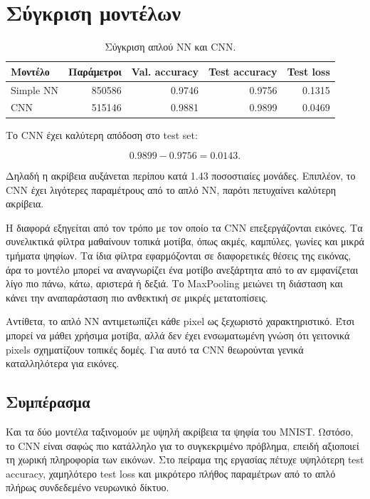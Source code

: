 \documentclass[12pt,a4paper]{article}
\begin{document}
\section{Σύγκριση μοντέλων}

\begin{table}[H]
\centering
\caption{Σύγκριση απλού NN και CNN.}
\begin{tabular}{lrrrr}
\toprule
\textbf{Μοντέλο} & \textbf{Παράμετροι} & \textbf{Val. accuracy} & \textbf{Test accuracy} & \textbf{Test loss} \\
\midrule
Simple NN & 850586 & 0.9746 & 0.9756 & 0.1315 \\
CNN & 515146 & 0.9881 & 0.9899 & 0.0469 \\
\bottomrule
\end{tabular}
\end{table}

Το CNN έχει καλύτερη απόδοση στο test set:

\[
    0.9899 - 0.9756 = 0.0143.
\]

Δηλαδή η ακρίβεια αυξάνεται περίπου κατά 1.43 ποσοστιαίες μονάδες. Επιπλέον,
το CNN έχει λιγότερες παραμέτρους από το απλό NN, παρότι πετυχαίνει καλύτερη
ακρίβεια.

Η διαφορά εξηγείται από τον τρόπο με τον οποίο τα CNN επεξεργάζονται εικόνες.
Τα συνελικτικά φίλτρα μαθαίνουν τοπικά μοτίβα, όπως ακμές, καμπύλες, γωνίες και
μικρά τμήματα ψηφίων. Τα ίδια φίλτρα εφαρμόζονται σε διαφορετικές θέσεις της
εικόνας, άρα το μοντέλο μπορεί να αναγνωρίζει ένα μοτίβο ανεξάρτητα από το αν
εμφανίζεται λίγο πιο πάνω, κάτω, αριστερά ή δεξιά. Το MaxPooling μειώνει τη
διάσταση και κάνει την αναπαράσταση πιο ανθεκτική σε μικρές μετατοπίσεις.

Αντίθετα, το απλό NN αντιμετωπίζει κάθε pixel ως ξεχωριστό χαρακτηριστικό.
Έτσι μπορεί να μάθει χρήσιμα μοτίβα, αλλά δεν έχει ενσωματωμένη γνώση ότι
γειτονικά pixels σχηματίζουν τοπικές δομές. Για αυτό τα CNN θεωρούνται γενικά
καταλληλότερα για εικόνες.

\subsection{Συμπέρασμα}

Και τα δύο μοντέλα ταξινομούν με υψηλή ακρίβεια τα ψηφία του MNIST. Ωστόσο,
το CNN είναι σαφώς πιο κατάλληλο για το συγκεκριμένο πρόβλημα, επειδή αξιοποιεί
τη χωρική πληροφορία των εικόνων. Στο πείραμα της εργασίας πέτυχε υψηλότερη
test accuracy, χαμηλότερο test loss και μικρότερο πλήθος παραμέτρων από το
απλό πλήρως συνδεδεμένο νευρωνικό δίκτυο.
\end{document}
